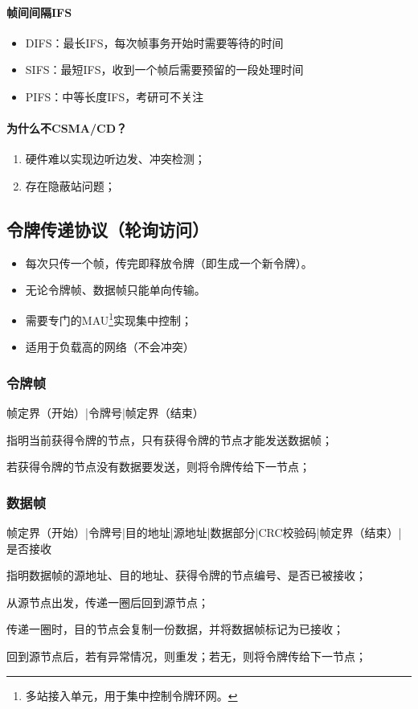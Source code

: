 \paragraph{帧间间隔IFS}
\begin{itemize}
    \item DIFS：最长IFS，每次帧事务开始时需要等待的时间
    \item SIFS：最短IFS，收到一个帧后需要预留的一段处理时间
    \item PIFS：中等长度IFS，考研可不关注
\end{itemize}


\paragraph{为什么不CSMA/CD？}
\begin{enumerate}
    \item 硬件难以实现边听边发、冲突检测；
    \item 存在隐蔽站问题；
\end{enumerate}


\subsection{令牌传递协议（轮询访问）}
\begin{itemize}
    \item 每次只传一个帧，传完即释放令牌（即生成一个新令牌）。
    \item 无论令牌帧、数据帧只能单向传输。
    \item 需要专门的MAU\footnote{多站接入单元，用于集中控制令牌环网。}实现集中控制；
    \item 适用于负载高的网络（不会冲突）
\end{itemize}


\subsubsection{令牌帧}
帧定界（开始）|令牌号|帧定界（结束）

指明当前获得令牌的节点，只有获得令牌的节点才能发送数据帧；

若获得令牌的节点没有数据要发送，则将令牌传给下一节点；


\subsubsection{数据帧}
帧定界（开始）|令牌号|目的地址|源地址|数据部分|CRC校验码|帧定界（结束）|是否接收

指明数据帧的源地址、目的地址、获得令牌的节点编号、是否已被接收；

从源节点出发，传递一圈后回到源节点；

传递一圈时，目的节点会复制一份数据，并将数据帧标记为已接收；

回到源节点后，若有异常情况，则重发；若无，则将令牌传给下一节点；






